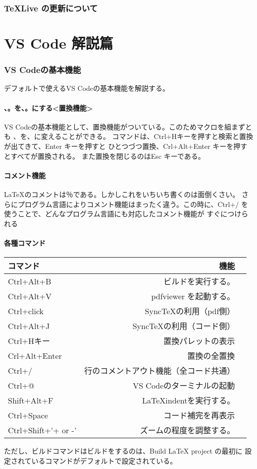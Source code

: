 \documentclass{ltjsarticle}
\begin{document}
\section{\TeX Live の更新について}

\part{VS Code 解説篇}
\section{VS Codeの基本機能}
デフォルトで使えるVS Codeの基本機能を解説する。
\subsection{、。を、。にする<置換機能>}
VS Codeの基本機能として、置換機能がついている。このためマクロを組まずとも
、を、に変えることができる。
コマンドは、Ctrl+Hキーを押すと検索と置換が出てきて、Enter キーを押すと
ひとつづつ置換、Crl+Alt+Enter キーを押すとすべてが置換される。
また置換を閉じるのはEsc キーである。
\subsection{コメント機能}
\LaTeX のコメントは％である。しかしこれをいちいち書くのは面倒くさい。
さらにプログラム言語によりコメント機能はまったく違う。この時に、Ctrl+/ を
使うことで、どんなプログラム言語にも対応したコメント機能が
すぐにつけられる
\subsection{各種コマンド}
\begin{center}
  \begin{tabular}{lrr} \hline
  コマンド            & 機能                  \\ \hline
  Ctrl+Alt+B          & ビルドを実行する。           \\
  Ctrl+Alt+V          & pdfviewer を起動する。    \\
  Ctrl+click          & SyncTeXの利用（pdf側）    \\
Ctrl+Alt+J            & SyncTeXの利用（コード側）    \\
  Ctrl+Hキー          & 置換パレットの表示           \\
    Crl+Alt+Enter     & 置換の全置換              \\
    Ctrl+/            & 行のコメントアウト機能（全コード共通） \\
    Ctrl+@            & VS Codeのターミナルの起動     \\
    Shift+Alt+F       & LaTeXindentを実行する。\\
    Ctrl+Space        & コード補完を再表示\\
    Ctrl+Shift+'+ or -' & ズームの程度を調整する。        \\ \hline
  \end{tabular}
\end{center}
ただし、ビルドコマンドはビルドをするのは、Build LaTeX project の最初に
設定されているコマンドがデフォルトで設定されている。
\end{document}

